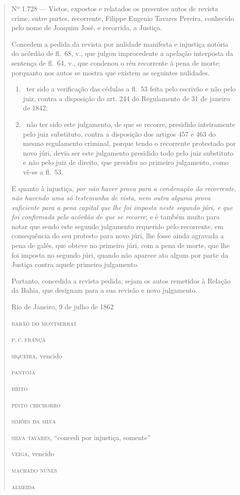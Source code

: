 \begin{quote}
Nº 1.728 --- Vistos, expostos e relatados os presentes autos de revista
crime, entre partes, recorrente, Filippe Eugenio Tavares Pereira,
conhecido pelo nome de Joaquim José, e recorrida, a Justiça.

Concedem a pedida da revista por nulidade manifesta e injustiça notória
do acórdão de fl.~68, v., que julgou improcedente a apelação interposta
da sentença de fl.~64, v., que condenou o réu recorrente à pena de
morte; porquanto nos autos se mostra que existem as seguintes nulidades.

\begin{enumerate}[label=\arabic*º:]
\item\ ter sido a verificação das cédulas a fl.~53 feita pelo escrivão e
não pelo juiz, contra a disposição do art. 244 do Regulamento de 31 de
janeiro de 1842;

\item\ não ter sido este julgamento, de que se recorre, presidido
inteiramente pelo juiz substituto, contra a disposição dos artigos 457 e
463 do mesmo regulamento criminal, porque tendo o recorrente protestado
por novo júri, devia ser este julgamento presidido todo pelo juiz
substituto e não pelo juiz de direito, que presidiu ao primeiro
julgamento, como vê-se a fl.~53.
\end{enumerate}

E quanto à injustiça, \emph{por não haver prova para a condenação do
recorrente, não havendo uma só testemunha de vista, nem outra alguma
prova suficiente para a pena capital que lhe foi imposta neste segundo
júri, e que foi confirmada pelo acórdão de que se recorre}; e é também
muito para notar que sendo este segundo julgamento requerido pelo
recorrente, em consequência do seu protesto para novo júri, lhe fosse
ainda agravada a pena de galés, que obteve no primeiro júri, com a pena
de morte, que lhe foi imposta no segundo júri, quando não aparece ato
algum por parte da Justiça contra aquele primeiro julgamento.

Portanto, concedida a revista pedida, sejam os autos remetidos à Relação
da Bahia, que designam para a sua revisão e novo julgamento.

\begin{flushright}
Rio de Janeiro, 9 de julho de 1862

\textsc{barão do montserrat}

\textsc{p.\,c.\,frança}

\textsc{siqueira}, vencido

\textsc{pantoja}

\textsc{brito}

\textsc{pinto chichorro}

\textsc{simões da silva}

\textsc{silva tavares}, ``concedi por injustiça, somente''

\textsc{veiga}, vencido

\textsc{machado nunes}

\textsc{almeida}
\end{flushright}
\end{quote}

